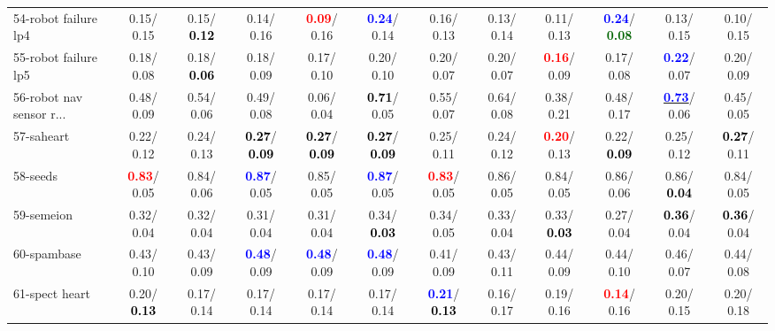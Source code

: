 \begin{table}[h]
\begin{center}
{\begin{tabular}{lc|c|c|c|c|c|c|c|c|c|c}
54-robot failure lp4 &   0.15/  0.15 &   0.15/\textcolor{black}{\textbf{  0.12}} &   0.14/  0.16 & \textcolor{red}{\textbf{  0.09}}/  0.16 & \textcolor{blue}{\textbf{  0.24}}/  0.14 &   0.16/  0.13 &   0.13/  0.14 &   0.11/  0.13 & \textcolor{blue}{\textbf{  0.24}}/\textcolor{darkgreen}{\textbf{  0.08}} &   0.13/  0.15 &   0.10/  0.15 \\
55-robot failure lp5 &   0.18/  0.08 &   0.18/\textcolor{black}{\textbf{  0.06}} &   0.18/  0.09 &   0.17/  0.10 &   0.20/  0.10 &   0.20/  0.07 &   0.20/  0.07 & \textcolor{red}{\textbf{  0.16}}/  0.09 &   0.17/  0.08 & \textcolor{blue}{\textbf{  0.22}}/  0.07 &   0.20/  0.09 \\
56-robot nav sensor r... &   0.48/  0.09 &   0.54/  0.06 &   0.49/  0.08 &   0.06/  0.04 & \textcolor{black}{\textbf{  0.71}}/  0.05 &   0.55/  0.07 &   0.64/  0.08 &   0.38/  0.21 &   0.48/  0.17 & \underline{\textcolor{blue}{\textbf{  0.73}}}/  0.06 &   0.45/  0.05 \\
57-saheart &   0.22/  0.12 &   0.24/  0.13 & \textcolor{black}{\textbf{  0.27}}/\textcolor{black}{\textbf{  0.09}} & \textcolor{black}{\textbf{  0.27}}/\textcolor{black}{\textbf{  0.09}} & \textcolor{black}{\textbf{  0.27}}/\textcolor{black}{\textbf{  0.09}} &   0.25/  0.11 &   0.24/  0.12 & \textcolor{red}{\textbf{  0.20}}/  0.13 &   0.22/\textcolor{black}{\textbf{  0.09}} &   0.25/  0.12 & \textcolor{black}{\textbf{  0.27}}/  0.11 \\
58-seeds & \textcolor{red}{\textbf{  0.83}}/  0.05 &   0.84/  0.06 & \textcolor{blue}{\textbf{  0.87}}/  0.05 &   0.85/  0.05 & \textcolor{blue}{\textbf{  0.87}}/  0.05 & \textcolor{red}{\textbf{  0.83}}/  0.05 &   0.86/  0.05 &   0.84/  0.05 &   0.86/  0.06 &   0.86/\textcolor{black}{\textbf{  0.04}} &   0.84/  0.05 \\
59-semeion &   0.32/  0.04 &   0.32/  0.04 &   0.31/  0.04 &   0.31/  0.04 &   0.34/\textcolor{black}{\textbf{  0.03}} &   0.34/  0.05 &   0.33/  0.04 &   0.33/\textcolor{black}{\textbf{  0.03}} &   0.27/  0.04 & \textcolor{black}{\textbf{  0.36}}/  0.04 & \textcolor{black}{\textbf{  0.36}}/  0.04 \\
60-spambase &   0.43/  0.10 &   0.43/  0.09 & \textcolor{blue}{\textbf{  0.48}}/  0.09 & \textcolor{blue}{\textbf{  0.48}}/  0.09 & \textcolor{blue}{\textbf{  0.48}}/  0.09 &   0.41/  0.09 &   0.43/  0.11 &   0.44/  0.09 &   0.44/  0.10 &   0.46/  0.07 &   0.44/  0.08 \\ \hline
61-spect heart &   0.20/\textcolor{black}{\textbf{  0.13}} &   0.17/  0.14 &   0.17/  0.14 &   0.17/  0.14 &   0.17/  0.14 & \textcolor{blue}{\textbf{  0.21}}/\textcolor{black}{\textbf{  0.13}} &   0.16/  0.17 &   0.19/  0.16 & \textcolor{red}{\textbf{  0.14}}/  0.16 &   0.20/  0.15 &   0.20/  0.18 \\

\end{tabular}}
\end{center}
\end{table}

